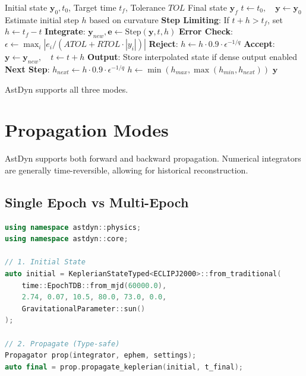 \begin{algorithm}
\caption{Adaptive Propagation Loop}
\begin{algorithmic}[1]
\REQUIRE Initial state $\mathbf{y}_0, t_0$, Target time $t_f$, Tolerance $TOL$
\ENSURE Final state $\mathbf{y}_f$
\STATE $t \leftarrow t_0, \quad \mathbf{y} \leftarrow \mathbf{y}_0$
\STATE Estimate initial step $h$ based on curvature
    \STATE \textbf{Step Limiting}: If $t + h > t_f$, set $h \leftarrow t_f - t$
    \REPEAT
        \STATE \textbf{Integrate}: $\mathbf{y}_{new}, \mathbf{e} \leftarrow \text{Step}(\mathbf{y}, t, h)$
        \STATE \textbf{Error Check}: $\epsilon \leftarrow \max_i |e_i / (ATOL + RTOL \cdot |y_i|)|$
            \STATE \textbf{Reject}: $h \leftarrow h \cdot 0.9 \cdot \epsilon^{-1/q}$
        \ELSE
            \STATE \textbf{Accept}: $\mathbf{y} \leftarrow \mathbf{y}_{new}, \quad t \leftarrow t + h$
            \STATE \textbf{Output}: Store interpolated state if dense output enabled
            \STATE \textbf{Next Step}: $h_{next} \leftarrow h \cdot 0.9 \cdot \epsilon^{-1/q}$
            \STATE $h \leftarrow \min(h_{max}, \max(h_{min}, h_{next}))$
        \ENDIF
\ENDWHILE
\RETURN $\mathbf{y}$
\end{algorithmic}
\end{algorithm}

AstDyn supports all three modes.

\section{Propagation Modes}

AstDyn supports both forward and backward propagation. Numerical integrators are generally time-reversible, allowing for historical reconstruction.

\subsection{Single Epoch vs Multi-Epoch}

\begin{lstlisting}[language=C++,caption={Single epoch propagation}]
using namespace astdyn::physics;
using namespace astdyn::core;

// 1. Initial State
auto initial = KeplerianStateTyped<ECLIPJ2000>::from_traditional(
    time::EpochTDB::from_mjd(60000.0),
    2.74, 0.07, 10.5, 80.0, 73.0, 0.0,
    GravitationalParameter::sun()
);

// 2. Propagate (Type-safe)
Propagator prop(integrator, ephem, settings);
auto final = prop.propagate_keplerian(initial, t_final);
\end{lstlisting}

